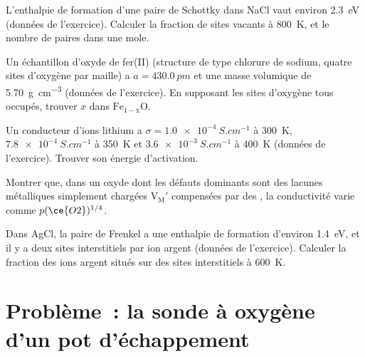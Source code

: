 \begin{exercise}[$\star\star$]\label{exo:b3:solid-state:8}
L'enthalpie de formation d'une paire de Schottky dans NaCl vaut environ
\qty{2.3}{eV} (données de l'exercice). Calculer la fraction de sites
vacants à \qty{800}{K}, et le nombre de paires dans une mole.
\end{exercise}

\begin{exercise}[$\star\star$]\label{exo:b3:solid-state:9}
Un échantillon d'oxyde de fer(II) (structure de type chlorure de sodium,
quatre sites d'oxygène par maille) a
$a = \qty{430.0}{pm}$ et une masse volumique de \qty{5.70}{g.cm^{-3}} (données de l'exercice). En supposant
les sites d'oxygène tous occupés, trouver $x$ dans $\mathrm{Fe_{1-x}O}$.
\end{exercise}

\begin{exercise}[$\star\star\star$]\label{exo:b3:solid-state:10}
Un conducteur d'ions lithium a $\sigma = \qty{1.0e-4}{S.cm^{-1}}$ à \qty{300}{K}, $\qty{7.8e-4}{S.cm^{-1}}$ à \qty{350}{K} et
$\qty{3.6e-3}{S.cm^{-1}}$ à \qty{400}{K} (données de l'exercice). Trouver son énergie d'activation.
\end{exercise}

\begin{exercise}[$\star\star\star$]\label{exo:b3:solid-state:11}
Montrer que, dans un oxyde dont les défauts dominants sont des lacunes
métalliques simplement chargées
$\mathrm{V_M'}$ compensées par des , la conductivité varie comme $p(\ce{O2})^{1/4}$.
\end{exercise}

\begin{exercise}[$\star\star\star$]\label{exo:b3:solid-state:12}
Dans AgCl, la paire de Frenkel a une enthalpie de formation d'environ
\qty{1.4}{eV}, et il y a deux sites interstitiels par ion argent (données
de l'exercice). Calculer la fraction des ions argent situés sur des sites
interstitiels à \qty{600}{K}.
\end{exercise}

\section{Problème~: la sonde à oxygène d'un pot d'échappement}

